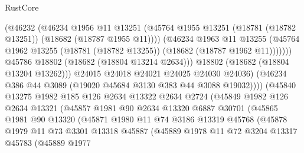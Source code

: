 \begin{lexlean}{RustCore}
\begin{coremodule}
                            (@46232
                              (@46234
                                @1956
                                @11
                                @13251
                                (@45764
                                  @1955
                                  @13251
                                  (@18781 (@18782 @13251))
                                  (@18682 (@18787 @1955 @11))))
                              (@46234
                                @1963
                                @11
                                @13255
                                (@45764
                                  @1962
                                  @13255
                                  (@18781 (@18782 @13255))
                                  (@18682 (@18787 @1962 @11)))))))
                        @45786
                        @18802
                        (@18682 (@18804 @13214 @2634)))
                      @18802
                      (@18682 (@18804 @13204 @13262)))
                    @24015
                    @24018
                    @24021
                    @24025
                    @24030
                    @24036)
                  (@46234 @386 @44 @3089 (@19020 @45684 @3130 @383 @44 @3088 @19032))))
              (@45840
                @13275
                @1982
                @185
                @126
                @2634
                @13322
                @2634
                @2724
                (@45849
                  @1982
                  @126
                  @2634
                  @13321
                  (@45857
                    @1981
                    @90
                    @2634
                    @13320
                    @6887
                    @30701
                    (@45865
                      @1981
                      @90
                      @13320
                      (@45871
                        @1980
                        @11
                        @74
                        @3186
                        @13319
                        @45768
                        (@45878
                          @1979
                          @11
                          @73
                          @3301
                          @13318
                          @45887
                          (@45889
                            @1978
                            @11
                            @72
                            @3204
                            @13317
                            @45783
                            (@45889
                              @1977

\end{coremodule}
\end{lexlean}
